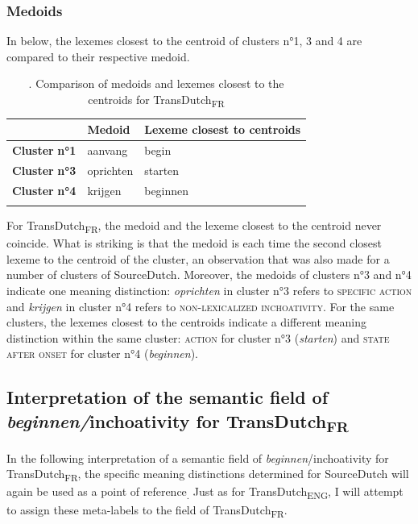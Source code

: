 \subsubsection{Medoids}
\label{sec:4.4.3.2}  
In  below, the lexemes closest to the centroid of clusters n°1, 3 and 4 are compared to their respective medoid.

\begin{table}
\caption{\label{tab:4:16}. Comparison of medoids and lexemes closest to the centroids for TransDutch\textsubscript{FR}}
\begin{tabularx}{\textwidth}{XXl}
\lsptoprule
& \textbf{Medoid} & \textbf{Lexeme} \textbf{closest} \textbf{to} \textbf{centroids}\\
\midrule 
\textbf{Cluster} \textbf{n°1} & aanvang & begin\\
\textbf{Cluster} \textbf{n°3} & oprichten & starten\\
\textbf{Cluster} \textbf{n°4} & krijgen & beginnen\\
\lspbottomrule
\end{tabularx}
\end{table}

For TransDutch\textsubscript{FR}, the medoid and the lexeme closest to the centroid never coincide. What is striking is that the medoid is each time the second closest lexeme to the centroid of the cluster, an observation that was also made for a number of clusters of SourceDutch. Moreover, the medoids of clusters n°3 and n°4 indicate one meaning distinction: \textit{oprichten} in cluster n°3 refers to {\textsc{specific}} \textsc{action} and \textit{krijgen} in cluster n°4 refers to {\textsc{non-lexicalized inchoativity}}. For the same clusters, the lexemes closest to the centroids indicate a different meaning distinction within the same cluster: \textsc{action} for cluster n°3 (\textit{starten}) and \textsc{state after onset} for cluster n°4 (\textit{beginnen}).

\subsection{Interpretation of the semantic field of \textit{beginnen/}inchoativity for TransDutch\textsubscript{FR}}
\label{sec:4.4.4}  
In the following interpretation of a semantic field of \textit{beginnen}/inchoativity for TransDutch\textsubscript{FR}, the specific meaning distinctions determined for SourceDutch will again be used as a point of reference\textsubscript{.} Just as for TransDutch\textsubscript{ENG}, I will attempt to assign these meta-labels to the field of TransDutch\textsubscript{FR}.


